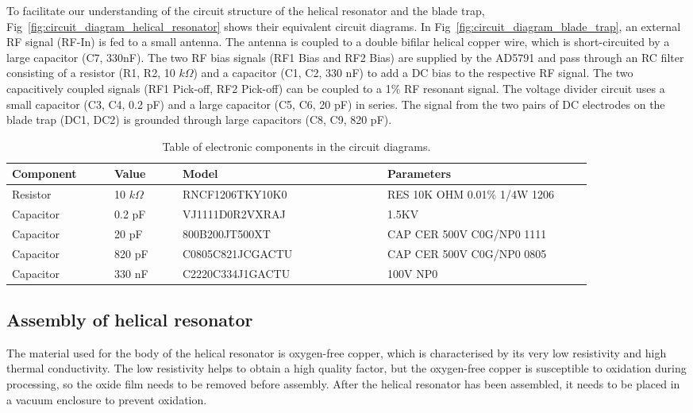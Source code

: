 To facilitate our understanding of the circuit structure of the helical resonator and the blade trap, Fig~\ref{fig:circuit_diagram_helical_resonator} shows their equivalent circuit diagrams. In Fig~\ref{fig:circuit_diagram_blade_trap}, an external RF signal (RF-In) is fed to a small antenna. The antenna is coupled to a double bifilar helical copper wire, which is short-circuited by a large capacitor (C7, 330nF). The two RF bias signals (RF1 Bias and RF2 Bias) are supplied by the AD5791 and pass through an RC filter consisting of a resistor (R1, R2, 10 $k\Omega$) and a capacitor (C1, C2, 330 nF) to add a DC bias to the respective RF signal. The two capacitively coupled signals (RF1 Pick-off, RF2 Pick-off) can be coupled to a 1\% RF resonant signal. The voltage divider circuit uses a small capacitor (C3, C4, 0.2 pF) and a large capacitor (C5, C6, 20 pF) in series. The signal from the two pairs of DC electrodes on the blade trap (DC1, DC2) is grounded through large capacitors (C8, C9, 820 pF).

\begin{table}
    \centering
    \caption{Table of electronic components in the circuit diagrams.}
    \begin{tabular}{p{0.15\linewidth}p{0.1\linewidth}p{0.3\linewidth}p{0.3\linewidth}}
        \toprule
        Component & Value        & Model            & Parameters                   \\
        \midrule
        Resistor  & 10 $k\Omega$ & RNCF1206TKY10K0  & RES 10K OHM 0.01\% 1/4W 1206 \\
        Capacitor & 0.2 pF       & VJ1111D0R2VXRAJ  & 1.5KV                        \\
        Capacitor & 20 pF        & 800B200JT500XT   & CAP CER  500V C0G/NP0 1111
        \\
        Capacitor & 820 pF       & C0805C821JCGACTU & CAP CER  500V C0G/NP0 0805   \\
        Capacitor & 330 nF       & C2220C334J1GACTU & 100V NP0
        \\
        \bottomrule
    \end{tabular}
\end{table}

\subsection{Assembly of helical resonator}

The material used for the body of the helical resonator is oxygen-free copper, which is characterised by its very low resistivity and high thermal conductivity. The low resistivity helps to obtain a high quality factor, but the oxygen-free copper is susceptible to oxidation during processing, so the oxide film needs to be removed before assembly. After the helical resonator has been assembled, it needs to be placed in a vacuum enclosure to prevent oxidation.

